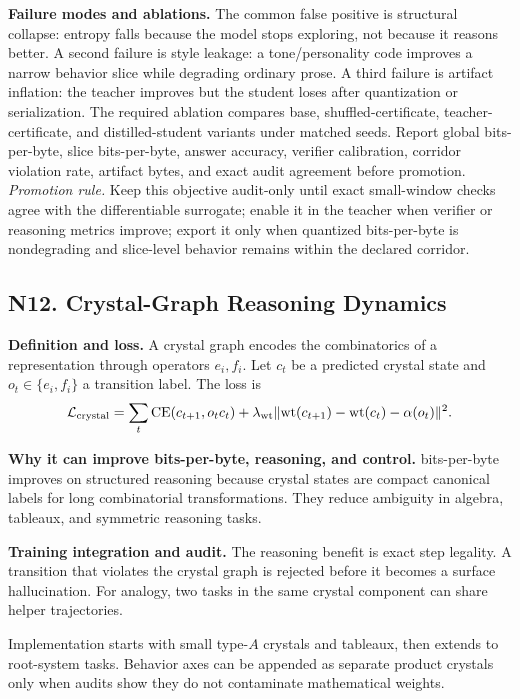 \documentclass[10pt]{article}
\newcommand{\loss}{\mathcal{L}}
\numberwithin{equation}{section}
\begin{document}
\noindent\textbf{Failure modes and ablations.} The common false positive is structural collapse: entropy falls because the model stops exploring, not because it reasons better. A second failure is style leakage: a tone/personality code improves a narrow behavior slice while degrading ordinary prose. A third failure is artifact inflation: the teacher improves but the student loses after quantization or serialization. The required ablation compares base, shuffled-certificate, teacher-certificate, and distilled-student variants under matched seeds. Report global bits-per-byte, slice bits-per-byte, answer accuracy, verifier calibration, corridor violation rate, artifact bytes, and exact audit agreement before promotion.
\vfill
\noindent\emph{Promotion rule.} Keep this objective audit-only until exact small-window checks agree with the differentiable surrogate; enable it in the teacher when verifier or reasoning metrics improve; export it only when quantized bits-per-byte is nondegrading and slice-level behavior remains within the declared corridor.
\clearpage
\subsection{N12. Crystal-Graph Reasoning Dynamics}
\noindent\textbf{Definition and loss.} A crystal graph encodes the combinatorics of a representation through operators $e_i,f_i$. Let $c_t$ be a predicted crystal state and $o_t\in\{e_i,f_i\}$ a transition label. The loss is
\[
\loss_{\rm crystal}=\sum_t\mathrm{CE}(c_{t+1},o_t c_t)+\lambda_{\rm wt}\|\mathrm{wt}(c_{t+1})-\mathrm{wt}(c_t)-\alpha(o_t)\|^2.
\]

\noindent\textbf{Why it can improve bits-per-byte, reasoning, and control.} bits-per-byte improves on structured reasoning because crystal states are compact canonical labels for long combinatorial transformations. They reduce ambiguity in algebra, tableaux, and symmetric reasoning tasks.

\noindent\textbf{Training integration and audit.} The reasoning benefit is exact step legality. A transition that violates the crystal graph is rejected before it becomes a surface hallucination. For analogy, two tasks in the same crystal component can share helper trajectories.

Implementation starts with small type-$A$ crystals and tableaux, then extends to root-system tasks. Behavior axes can be appended as separate product crystals only when audits show they do not contaminate mathematical weights.
\end{document}
